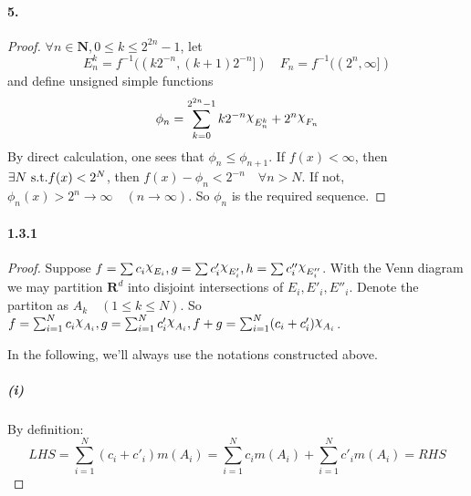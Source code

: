 \documentclass{article}
\begin{document}
\paragraph{5.}
\begin{proof}
$\forall n\in\mathbf{N},0\leq k\leq 2^{2n}-1$, let
\[E_n^k=f^{-1}((k2^{-n},(k+1)2^{-n}])\quad F_n=f^{-1}((2^n,\infty])\]
and define unsigned simple functions
\begin{equation}\label{folland}
\phi_n=\sum_{k=0}^{2^{2n}-1}k2^{-n}\rchi_{E_n^k}+2^n\rchi_{F_n}
\end{equation}
By direct calculation, one sees that $\phi_n\leq\phi_{n+1}$. If $f(x)<\infty$, then $\exists N\text{ s.t.} f(x)<2^N$, then $f(x)-\phi_n<2^{-n}\quad \forall n>N$. If not, $\phi_n(x)>2^n\to\infty\quad (n\to\infty)$. So $\phi_n$ is the required sequence.

\end{proof}



\paragraph{1.3.1}

\begin{proof}
Suppose $f=\sum c_i\rchi_{E_i},g=\sum c'_i\rchi_{E'_i}, h=\sum c''_i\rchi_{E''_i}$. With the Venn diagram we may partition $\mathbf{R}^d$ into disjoint intersections of $E_i,E'_i,E''_i$. Denote the partiton as $A_k\quad (1\leq k\leq N)$. So $f=\sum_{i=1}^{N}c_i\rchi_{A_i},g=\sum_{i=1}^{N}c'_i\rchi_{A_i},f+g=\sum_{i=1}^{N}(c_i+c'_i)\rchi_{A_i}$. 

In the following, we'll always use the notations constructed above.
\subparagraph{(i)}
By definition:
\[
LHS=\sum_{i=1}^{N}(c_i+c'_i)m(A_i)=\sum_{i=1}^{N}c_im(A_i)+\sum_{i=1}^{N}c'_im(A_i)=RHS
\]
\end{proof}
\end{document}
